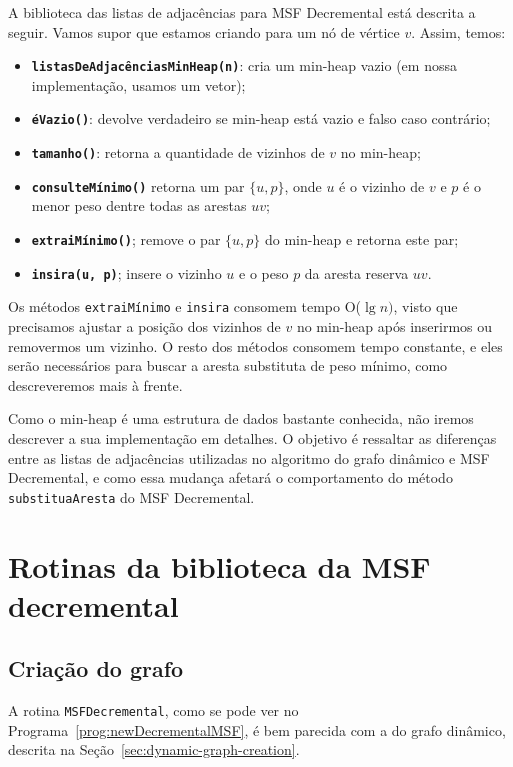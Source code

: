 A biblioteca das listas de adjacências para MSF Decremental está descrita a seguir. Vamos supor que estamos criando para um nó de vértice $v$. Assim, temos:

\begin{itemize}
    \item \texttt{\textbf{listasDeAdjacênciasMinHeap(n)}}: cria um min-heap vazio (em nossa implementação, usamos um vetor);
    \item \texttt{\textbf{éVazio()}}: devolve verdadeiro se min-heap está vazio e falso caso contrário;
    \item \texttt{\textbf{tamanho()}}: retorna a quantidade de vizinhos de $v$ no min-heap;
    \item \texttt{\textbf{consulteMínimo()}} retorna um par $\{u, p\}$, onde $u$ é o vizinho de $v$ e $p$ é o menor peso dentre todas as arestas $uv$;
    \item \texttt{\textbf{extraiMínimo()}}; remove o par $\{u, p\}$ do min-heap e retorna este par;
    \item \texttt{\textbf{insira(u, p)}}; insere o vizinho $u$ e o peso $p$ da aresta reserva $uv$.

\end{itemize} 

Os métodos \texttt{extraiMínimo} e \texttt{insira} consomem tempo O($\lg n)$, visto que precisamos ajustar a posição dos vizinhos de $v$ no min-heap após inserirmos ou removermos um vizinho. O resto dos métodos consomem tempo constante, e eles serão necessários para buscar a aresta substituta de peso mínimo, como descreveremos mais à frente.

Como o min-heap é uma estrutura de dados bastante conhecida, não iremos descrever a sua implementação em detalhes. O objetivo é ressaltar as diferenças entre as listas de adjacências utilizadas no algoritmo do grafo dinâmico e MSF Decremental, e como essa mudança afetará o comportamento do método \texttt{substituaAresta} do MSF Decremental.

\section{Rotinas da biblioteca da MSF decremental}

\subsection{Criação do grafo}

A rotina \texttt{MSFDecremental}, como se pode ver no Programa~\ref{prog:newDecrementalMSF}, é bem parecida com a do grafo dinâmico, descrita na Seção~\ref{sec:dynamic-graph-creation}. 

